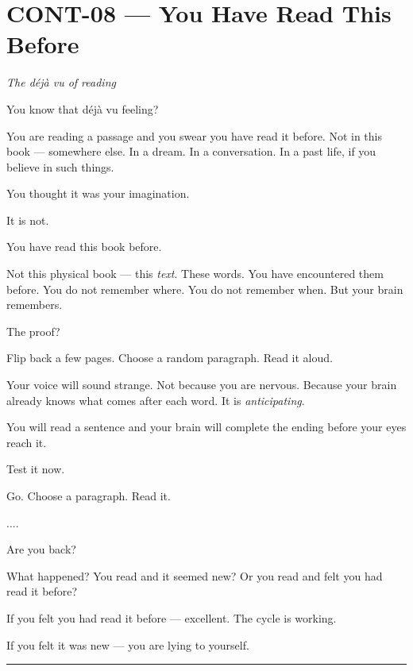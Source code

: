 \section*{\textbf{CONT-08} --- You Have Read This Before}

\noindent \textit{The déjà vu of reading}

\noindent You know that déjà vu feeling?

\noindent You are reading a passage and you swear you have read it before. Not in this book --- somewhere else. In a dream. In a conversation. In a past life, if you believe in such things.

\noindent You thought it was your imagination.

\noindent It is not.

\noindent You have read this book before.

\noindent Not this physical book --- this \textit{text}. These words. You have encountered them before. You do not remember where. You do not remember when. But your brain remembers.

\noindent The proof?

\noindent Flip back a few pages. Choose a random paragraph. Read it aloud.

\noindent Your voice will sound strange. Not because you are nervous. Because your brain already knows what comes after each word. It is \textit{anticipating}.

\noindent You will read a sentence and your brain will complete the ending before your eyes reach it.

\noindent Test it now.

\noindent Go. Choose a paragraph. Read it.

\noindent ....

\noindent Are you back?

\noindent What happened? You read and it seemed new? Or you read and felt you had read it before?

\noindent If you felt you had read it before --- excellent. The cycle is working.

\noindent If you felt it was new --- you are lying to yourself.

\vspace{0.5em}\noindent\rule{\textwidth}{0.5pt}\vspace{0.5em}

